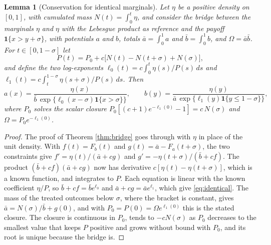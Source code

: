 \documentclass[11pt,a4paper]{article}
\theoremstyle{notesplain}
\newtheorem{lemma}[theorem]{Lemma}
\theoremstyle{notesupright}
\numberwithin{equation}{section}
\begin{document}
\begin{lemma}[Conservation for identical marginals]
\label{lem:identical}
Let $\eta$ be a positive density on $[0,1]$, with cumulated mass $N(t)=\int_0^t\eta$, and consider the bridge between the marginals $\eta$ and $\eta$ with the Lebesgue product as reference and the payoff $\mathbf 1\{x>y+\sigma\}$, with potentials $a$ and $b$, totals $\bar a=\int_0^1a$ and $\bar b=\int_0^1b$, and $\Omega=\bar a\bar b$. For $t\in[0,1-\sigma]$ let
\begin{equation}
P(t)=P_0+c\big[N(t)-N(t+\sigma)+N(\sigma)\big],
\end{equation}
and define the two log-exponents $\ell_0(t)=c\int_0^t\eta(s)/P(s)\,ds$ and $\ell_1(t)=c\int_t^{1-\sigma}\eta(s+\sigma)/P(s)\,ds$. Then
\begin{equation}
a(x)=\frac{\eta(x)}{\bar b\,\exp\{\ell_0(x-\sigma)\mathbf 1\{x>\sigma\}\}},\qquad
b(y)=\frac{\eta(y)}{\bar a\,\exp\{\ell_1(y)\mathbf 1\{y\le1-\sigma\}\}},
\label{eq:identical}
\end{equation}
where $P_0$ solves the scalar closure $P_0[(c+1)e^{-\ell_1(0)}-1]=c\,N(\sigma)$ and $\Omega=P_0e^{-\ell_1(0)}$.
\end{lemma}

\begin{proof}
The proof of Theorem \ref{thm:bridge} goes through with $\eta$ in place of the unit density. With $f(t)=F_b(t)$ and $g(t)=\bar a-F_a(t+\sigma)$, the two constraints give $f'=\eta(t)/(\bar a+cg)$ and $g'=-\eta(t+\sigma)/(\bar b+cf)$. The product $(\bar b+cf)(\bar a+cg)$ now has derivative $c[\eta(t)-\eta(t+\sigma)]$, which is a known function, and integrates to $P$. Each equation is linear with the known coefficient $\eta/P$, so $\bar b+cf=\bar be^{\ell_0}$ and $\bar a+cg=\bar ae^{\ell_1}$, which give \eqref{eq:identical}. The mass of the treated outcomes below $\sigma$, where the bracket is constant, gives $\bar a=N(\sigma)/\bar b+g(0)$, and with $P_0=P(0)=\Omega e^{\ell_1(0)}$ this is the stated closure. The closure is continuous in $P_0$, tends to $-cN(\sigma)$ as $P_0$ decreases to the smallest value that keeps $P$ positive and grows without bound with $P_0$, and its root is unique because the bridge is.
\end{proof}
\end{document}
